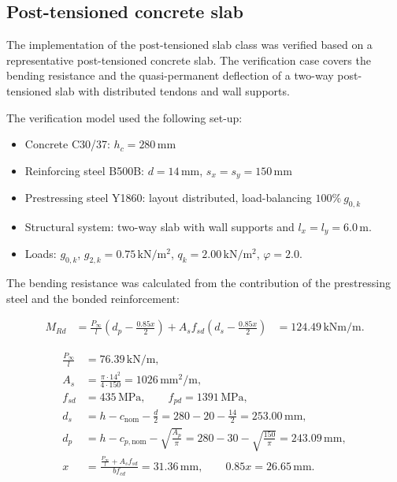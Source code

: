\subsection{Post-tensioned concrete slab}

The implementation of the post-tensioned slab class was verified based on a representative post-tensioned concrete slab. The verification case covers the bending resistance and the quasi-permanent deflection of a two-way post-tensioned slab with distributed tendons and wall supports.

The verification model used the following set-up:\vspace{-0.8em}
\begin{itemize}
    \item Concrete C30/37: \(h_c=280\,\mathrm{mm}\)\vspace{-0.8em}
    \item Reinforcing steel B500B: \(d=14\,\mathrm{mm}\), \(s_x=s_y=150\,\mathrm{mm}\)\vspace{-0.8em}
    \item Prestressing steel Y1860: layout distributed, load-balancing $100\% \ g_{0,k}$\vspace{-0.8em}
    \item Structural system: two-way slab with wall supports and \(l_x=l_y=6.0\,\mathrm{m}\).\vspace{-0.8em}
    \item Loads: \(g_{0,k}\), \(g_{2,k}=0.75\,\mathrm{kN/m^2}\), \(q_k=2.00\,\mathrm{kN/m^2}\),  \(\varphi=2.0\).\vspace{-0.8em}
\end{itemize}

The bending resistance was calculated from the contribution of the prestressing steel and the bonded reinforcement:

\begin{equation}
\begin{aligned}
M_{Rd}
&=
\frac{P_{\infty}}{l}
\left(d_p-\frac{0.85x}{2}\right)
+
A_s f_{sd}
\left(d_s-\frac{0.85x}{2}\right)
&=
124.49\,\mathrm{kNm/m}.
\end{aligned}
\end{equation}

\begin{equation}
\begin{aligned}
\frac{P_{\infty}}{l}
&=
76.39\,\mathrm{kN/m},\\
A_s
&=
\frac{\pi \cdot 14^2}{4 \cdot 150}
=
1026\,\mathrm{mm^2/m},\\
f_{sd}
&=
435\,\mathrm{MPa},
\qquad
f_{pd}
=
1391\,\mathrm{MPa},\\
d_s
&=
h-c_{\mathrm{nom}}-\frac{d}{2}
=
280-20-\frac{14}{2}
=
253.00\,\mathrm{mm},\\
d_p
&=
h-c_{p,\mathrm{nom}}-\sqrt{\frac{A_p}{\pi}}
=
280-30-\sqrt{\frac{150}{\pi}}
=
243.09\,\mathrm{mm},\\
x
&=
\frac{\frac{P_{\infty}}{l}+A_s f_{sd}}
{b f_{cd}}
=
31.36\,\mathrm{mm},
\qquad
0.85x
=
26.65\,\mathrm{mm}.
\end{aligned}
\end{equation}

